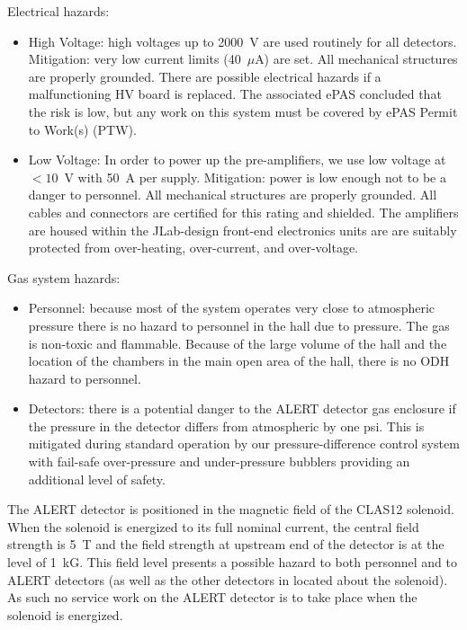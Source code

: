 Electrical hazards:
\begin{itemize}
\item High Voltage: high voltages up to 2000~V are used routinely for all detectors. Mitigation: 
very low current limits (40~$\mu$A) are set. All mechanical structures are properly grounded.  
There are possible electrical hazards if a malfunctioning HV board is replaced. The associated
ePAS concluded that the risk is low, but any work on this system must be covered by ePAS Permit
to Work(s) (PTW).

\item Low Voltage: In order to power up the pre-amplifiers, we use low voltage at $<10$~V with
50~A per supply. Mitigation: power is low enough not to be a danger to personnel. All mechanical
structures are properly grounded. All cables and connectors are certified for this rating and
shielded. The amplifiers are housed within the JLab-design front-end electronics units are are
suitably protected from over-heating, over-current, and over-voltage.

\end{itemize}

Gas system hazards:
\begin{itemize}
\item Personnel: because most of the system operates very close to atmospheric pressure there 
is no hazard to personnel in the hall due to pressure. The gas is non-toxic and flammable.  
Because of the large volume of the hall and the location of the chambers in the main open area 
of the hall, there is no ODH hazard to personnel.
\item Detectors: there is a potential danger to the ALERT detector gas enclosure if the pressure
in the detector differs from atmospheric by one psi. This is mitigated during standard operation by our 
pressure-difference control system with fail-safe over-pressure and under-pressure bubblers 
providing an additional level of safety.
\end{itemize}

The ALERT detector is positioned in the magnetic field of the CLAS12 solenoid. When the solenoid is
energized to its full nominal current, the central field strength is 5~T and the field strength at
upstream end of the detector is at the level of 1~kG. This field level presents a possible hazard to
both personnel and to ALERT detectors (as well as the other detectors in located about the solenoid).
As such no service work on the ALERT detector is to take place when the solenoid is energized.

